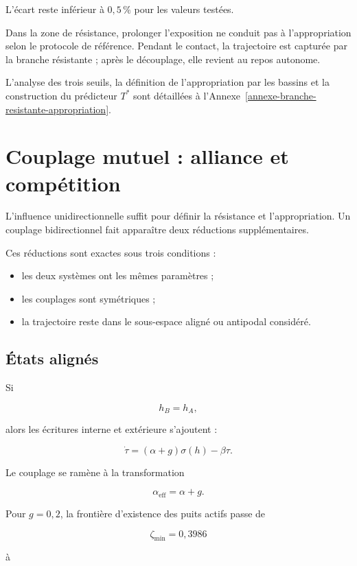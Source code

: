 L'écart reste inférieur à \(0{,}5\,\%\) pour les valeurs testées.

Dans la zone de résistance, prolonger l'exposition ne conduit pas à l'appropriation selon le protocole de référence. Pendant le contact, la trajectoire est capturée par la branche résistante ; après le découplage, elle revient au repos autonome.

L'analyse des trois seuils, la définition de l'appropriation par les bassins et la construction du prédicteur \(T^\ast\) sont détaillées à l'Annexe~\ref{annexe-branche-resistante-appropriation}.

\chapter{Couplage mutuel : alliance et compétition}\label{t2-couplage-mutuel-alliance-et-competition}

L'influence unidirectionnelle suffit pour définir la résistance et l'appropriation. Un couplage bidirectionnel fait apparaître deux réductions supplémentaires.

Ces réductions sont exactes sous trois conditions :

\begin{itemize}
\tightlist
\item
  les deux systèmes ont les mêmes paramètres ;
\item
  les couplages sont symétriques ;
\item
  la trajectoire reste dans le sous-espace aligné ou antipodal considéré.
\end{itemize}

\section{États alignés}\label{t2-etats-alignes}

Si

\[
h_B=h_A,
\]

alors les écritures interne et extérieure s'ajoutent :

\[
\dot\tau
=
(\alpha+g)\sigma(h)-\beta\tau.
\]

Le couplage se ramène à la transformation

\[
\alpha_{\mathrm{eff}}=\alpha+g.
\]

Pour \(g=0{,}2\), la frontière d'existence des puits actifs passe de

\[
\zeta_{\min}=0{,}3986
\]

à

